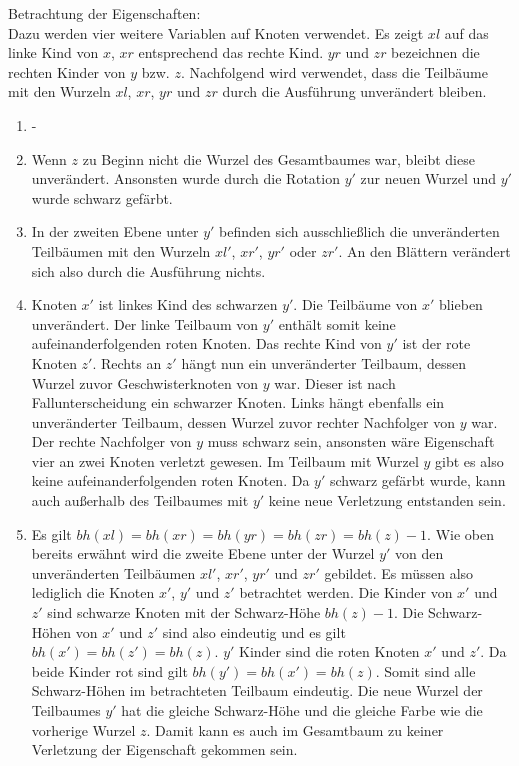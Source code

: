 \documentclass[a4paper,12pt]{article}
\begin{document}
\noindent Betrachtung der Eigenschaften:\\
\noindent Dazu werden vier weitere Variablen auf Knoten verwendet. Es zeigt $\mathit{xl}$ auf das linke Kind von $x$,  $\mathit{xr}$ entsprechend das rechte Kind. $\mathit{yr}$ und $zr$ bezeichnen die rechten Kinder von $y$ bzw. $z$. Nachfolgend wird verwendet, dass die Teilbäume mit den Wurzeln $xl$, $xr$, $yr$ und $zr$ durch die Ausführung unverändert bleiben.
\begin{enumerate}
	\item -
	\item Wenn $z$ zu Beginn nicht die Wurzel des Gesamtbaumes war, bleibt diese unverändert. Ansonsten wurde durch die Rotation $y'$ zur neuen Wurzel und $y'$ wurde schwarz gefärbt. 
	\item  In der zweiten Ebene unter $y'$ befinden sich ausschließlich die unveränderten Teilbäumen mit den Wurzeln $xl'$, $xr'$, $yr'$ oder $zr'$. An den Blättern verändert sich also durch die Ausführung nichts.
	\item  Knoten $x'$ ist linkes Kind des schwarzen $y'$. Die Teilbäume von $x'$ blieben unverändert. Der linke Teilbaum von $y'$ enthält somit keine aufeinanderfolgenden roten Knoten. Das rechte Kind von $y'$ ist der rote Knoten $z'$. Rechts an $z'$ hängt nun ein unveränderter Teilbaum, dessen Wurzel zuvor Geschwisterknoten von $y$ war. Dieser ist nach Fallunterscheidung ein schwarzer Knoten. Links hängt ebenfalls ein unveränderter Teilbaum, dessen Wurzel zuvor rechter Nachfolger von $y$ war. Der rechte Nachfolger von $y$ muss schwarz sein, ansonsten wäre Eigenschaft vier an zwei Knoten verletzt gewesen. Im Teilbaum mit Wurzel $y$ gibt es also keine aufeinanderfolgenden roten Knoten. Da $y'$ schwarz gefärbt wurde, kann auch außerhalb des Teilbaumes mit $y'$ keine neue Verletzung entstanden sein.
	\item  Es gilt  $\mathit{bh(xl)} = \mathit{bh(xr)} = \mathit{bh(yr)} =  \mathit{bh(zr)} = \mathit{bh(z)} - 1$. Wie oben bereits erwähnt wird die zweite Ebene unter der Wurzel $y'$ von den unveränderten Teilbäumen $\mathit{xl'}$, $\mathit{xr'}$, $\mathit{yr'}$ und $\mathit{zr'}$ gebildet. Es müssen also lediglich die Knoten $x'$, $y'$ und $z'$ betrachtet werden. Die Kinder von $x'$ und $z'$ sind schwarze Knoten mit der Schwarz-Höhe $\mathit{bh(z)} - 1$. Die Schwarz-Höhen von $x'$ und $z'$ sind also eindeutig und es gilt $\mathit{bh(x')} = \mathit{bh(z')} = \mathit{bh(z)}$. $y'$ Kinder sind die roten Knoten $x'$ und $z'$. Da beide Kinder rot sind gilt $\mathit{bh(y')} = \mathit{bh(x')} = \mathit{bh(z)}$. Somit sind alle Schwarz-Höhen im betrachteten Teilbaum eindeutig. Die neue Wurzel der Teilbaumes $y'$ hat die gleiche Schwarz-Höhe und die gleiche Farbe wie die vorherige Wurzel $z$. Damit kann es auch im Gesamtbaum zu keiner Verletzung der Eigenschaft gekommen sein.
\end{enumerate} 
\end{document}
